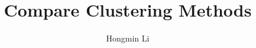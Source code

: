 \documentclass[a4paper,10pt]{article}
\begin{document}
    \title{Compare Clustering Methods}
    \maketitle
    \begin{center}
        \author{Hongmin Li}
    \end{center}

    \begin{center}
        \begin{adjustbox}{width=1\textwidth}

        
    \end{adjustbox}

        
    \end{center}
    
\end{document}
